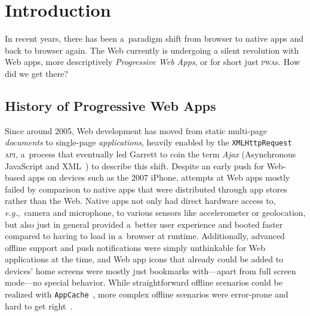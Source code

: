\documentclass[sigconf]{acmart}
\begin{document}
%
%


\maketitle

\section{Introduction}

In recent years, there has been a~paradigm shift
from browser to native apps and back to browser again.
The Web currently is undergoing a silent revolution with Web apps,
more descriptively \emph{Progressive Web Apps},
or for short just \textsc{pwa}s.
How did we get there?

\subsection{History of Progressive Web Apps}

Since around 2005, Web development has moved from static multi-page \emph{documents}
to single-page \emph{applications}, heavily enabled by the \texttt{XMLHttpRequest} \textsc{api},
a~process that eventually led Garrett to coin the term \emph{Ajax}
(Asynchronous JavaScript and XML~\cite{garret2005ajax}) to describe this shift.
Despite an early push for Web-based apps on devices such as the 2007 iPhone,
attempts at Web apps mostly failed by comparison to native apps
that were distributed through app stores rather than the Web.
Native apps not only had direct hardware access to, \emph{e.g.},\ camera and microphone,
to various sensors like accelerometer or geolocation, but also just in general provided
a~better user experience and booted faster compared to having to load in a~browser at runtime.
Additionally, advanced offline support and push notifications were simply unthinkable
for Web applications at the time, and Web app icons
that already could be added to devices' home screens
were mostly just bookmarks with---apart from full screen mode---no special behavior.
While straightforward offline scenarios could be realized with
\texttt{AppCache}~\cite{vankesteren2008offlinewebapps}, more complex offline scenarios were error-prone
and hard to get right~\cite{archibald2012douchebag}.
\end{document}
